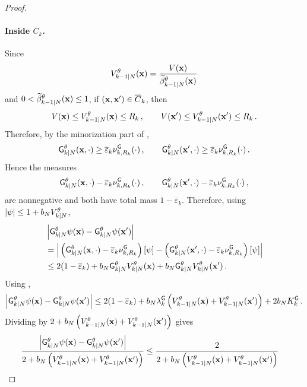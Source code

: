 \documentclass[11pt]{article}
\theoremstyle{plain}
\theoremstyle{definition}
\theoremstyle{remark}
\begin{document}
\begin{proof}
\paragraph{Inside $\overline C_k$.}
Since
$$
\twistedlyap{k-1}{N}[\theta](\x)
= \frac{V(\x)}{\normbackwardfun{k-1}{N}[\theta](\x)}
$$
and $ 0 < \normbackwardfun{k-1}{N}[\theta](\x) \le 1$, if $(\mathbf{x},\mathbf{x}')\in\overline C_k$, then
$$
V(\x)\le \twistedlyap{k-1}{N}[\theta](\x)\le R_k \eqsp,
\qquad V(\x')\le \twistedlyap{k-1}{N}[\theta](\x')\le R_k \eqsp.
$$
Therefore, by the minorization part of
,
$$
\fsmk{k}{N}[\theta](\x,\cdot) \ge \overline\varepsilon_k \nu_{k,R_k}^{\mathsf G}(\cdot) \eqsp,
\qquad \fsmk{k}{N}[\theta](\x',\cdot) \ge \overline\varepsilon_k \nu_{k,R_k}^{\mathsf G}(\cdot) \eqsp.
$$
Hence the measures
$$
\fsmk{k}{N}[\theta](\x,\cdot) - \overline\varepsilon_k\nu_{k,R_k}^{\mathsf G}(\cdot) \eqsp,
\qquad \fsmk{k}{N}[\theta](\x',\cdot) - \overline\varepsilon_k\nu_{k,R_k}^{\mathsf G}(\cdot) \eqsp,
$$
are nonnegative and both have total mass $1-\overline\varepsilon_k$. Therefore, using $|\psi|\le1+b_N\twistedlyap{k}{N}[\theta]$,
\begin{align*}
& \left| \fsmk{k}{N}[\theta]\psi(\x) - \fsmk{k}{N}[\theta]\psi(\x') \right| \\
&= \Big| \left( \fsmk{k}{N}[\theta](\x,\cdot) - \overline\varepsilon_k\nu_{k,R_k}^{\mathsf G} \right)[\psi] - \left( \fsmk{k}{N}[\theta](\x',\cdot) - \overline\varepsilon_k\nu_{k,R_k}^{\mathsf G} \right)[\psi] \Big| \\
&\le 2(1-\overline\varepsilon_k) + b_N\fsmk{k}{N}[\theta] \twistedlyap{k}{N}[\theta](\x) + b_N \fsmk{k}{N}[\theta] \twistedlyap{k}{N}[\theta](\x') \eqsp.
\end{align*}
%
Using ,
\begin{multline}
\label{eq:inside_small_set_contraction}
\left| \fsmk{k}{N}[\theta]\psi(\x) - \fsmk{k}{N}[\theta]\psi(\x') \right| \le 2(1-\overline\varepsilon_k) + b_N \lambda_k^{\mathsf G} \left( \twistedlyap{k-1}{N}[\theta](\x) + \twistedlyap{k-1}{N}[\theta](\x') \right) + 2 b_N K_k^{\mathsf G} \eqsp.
\end{multline}
Dividing by $2+ b_N \left( \twistedlyap{k-1}{N}[\theta](\x) + \twistedlyap{k-1}{N}[\theta](\x') \right)$
gives
\begin{align*}
\frac{ \left| \fsmk{k}{N}[\theta]\psi(\x) - \fsmk{k}{N}[\theta]\psi(\x') \right|}{ 2+ b_N \left( \twistedlyap{k-1}{N}[\theta](\x) + \twistedlyap{k-1}{N}[\theta](\x') \right) }  & \le \frac{2}{2+b_N \left( \twistedlyap{k-1}{N}[\theta](\x) +\twistedlyap{k-1}{N}[\theta](\x') \right)}

\end{align*}
\end{proof}
\end{document}

